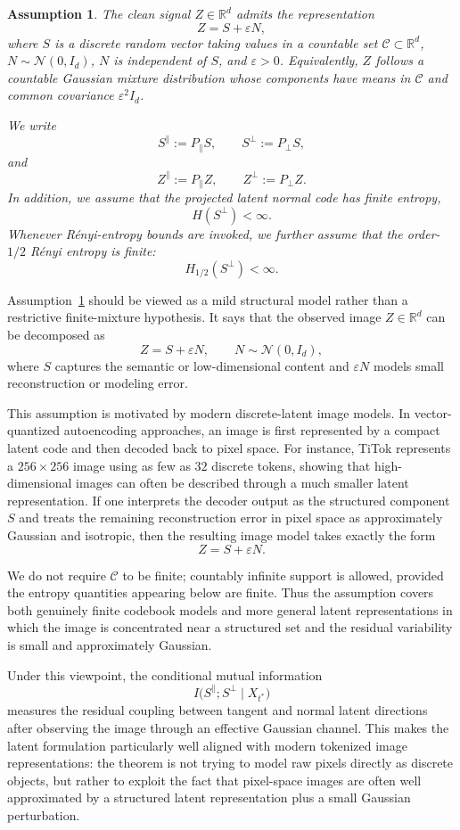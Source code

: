 \documentclass[twoside,11pt]{article}
\newcommand{\R}{\mathbb{R}}
\newcommand{\Nc}{\mathcal{N}}
\newcommand{\Cc}{\mathcal{C}}
\numberwithin{equation}{section}
\newtheorem{assumption}{Assumption}[section]
\begin{document}
\begin{assumption}
\label{ass:latent_gaussian_mixture}
The clean signal \(Z\in\R^d\) admits the representation
\[
Z=S+\varepsilon N,
\]
where \(S\) is a discrete random vector taking values in a countable set
\(\Cc\subset\R^d\), \(N\sim\Nc(0,I_d)\), \(N\) is independent of \(S\), and
\(\varepsilon>0\). Equivalently, \(Z\) follows a countable Gaussian mixture
distribution whose components have means in \(\Cc\) and common covariance
\(\varepsilon^2 I_d\).

We write
\[
S^\parallel:=P_\parallel S,\qquad S^\perp:=P_\perp S,
\]
and
\[
Z^\parallel:=P_\parallel Z,\qquad Z^\perp:=P_\perp Z.
\]
In addition, we assume that the projected latent normal code has finite entropy,
\[
H(S^\perp)<\infty .
\]
Whenever Rényi-entropy bounds are invoked, we further assume that the order-\(1/2\)
Rényi entropy is finite:
\[
H_{1/2}(S^\perp)<\infty .
\]
\end{assumption}
\begin{remark}
Assumption~\ref{ass:latent_gaussian_mixture} should be viewed as a mild structural model
rather than a restrictive finite-mixture hypothesis. It says that the observed image
\(Z\in\R^d\) can be decomposed as
\[
Z=S+\varepsilon N,\qquad N\sim\Nc(0,I_d),
\]
where \(S\) captures the semantic or low-dimensional content and \(\varepsilon N\) models
small reconstruction or modeling error.

This assumption is motivated by modern discrete-latent image models. In vector-quantized
autoencoding approaches, an image is first represented by a compact latent code and then
decoded back to pixel space. For instance, TiTok represents a \(256\times256\) image using
as few as \(32\) discrete tokens, showing that high-dimensional images can often be
described through a much smaller latent representation. 
If one interprets the decoder output as the structured component \(S\) and treats the
remaining reconstruction error in pixel space as approximately Gaussian and isotropic, then
the resulting image model takes exactly the form
\[
Z=S+\varepsilon N.
\]

We do not require \(\mathcal C\) to be finite; countably infinite support is allowed,
provided the entropy quantities appearing below are finite. Thus the assumption covers both genuinely finite codebook models and more general
latent representations in which the image is concentrated near a structured set and the
residual variability is small and approximately Gaussian.

Under this viewpoint, the conditional mutual information
\[
I\!\big(S^\parallel;S^\perp\mid X_{t^*}\big)
\]
measures the residual coupling between tangent and normal latent directions after observing
the image through an effective Gaussian channel. This makes the latent formulation
particularly well aligned with modern tokenized image representations: the theorem is not
trying to model raw pixels directly as discrete objects, but rather to exploit the fact that
pixel-space images are often well approximated by a structured latent representation plus a
small Gaussian perturbation.
\end{remark}
\end{document}
